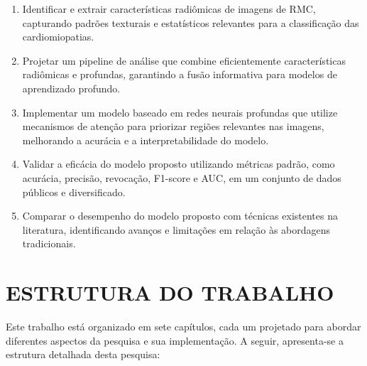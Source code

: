 \begin{enumerate}
\item Identificar e extrair características radiômicas de imagens de \gls{RMC}, capturando padrões texturais e estatísticos relevantes para a classificação das cardiomiopatias.

\item Projetar um pipeline de análise que combine eficientemente características radiômicas e profundas, garantindo a fusão informativa para modelos de aprendizado profundo.

\item Implementar um modelo baseado em redes neurais profundas que utilize mecanismos de atenção para priorizar regiões relevantes nas imagens, melhorando a acurácia e a interpretabilidade do modelo.

\item Validar a eficácia do modelo proposto utilizando métricas padrão, como acurácia, precisão, revocação, F1-score e \gls{AUC}, em um conjunto de dados públicos e diversificado.

\item Comparar o desempenho do modelo proposto com técnicas existentes na literatura, identificando avanços e limitações em relação às abordagens tradicionais.
\end{enumerate}


\section{ESTRUTURA DO TRABALHO}
\label{sec:cap1_estrutura_trabalho}

Este trabalho está organizado em sete capítulos, cada um projetado para abordar diferentes aspectos da pesquisa e sua implementação. A seguir, apresenta-se a estrutura detalhada desta pesquisa:

